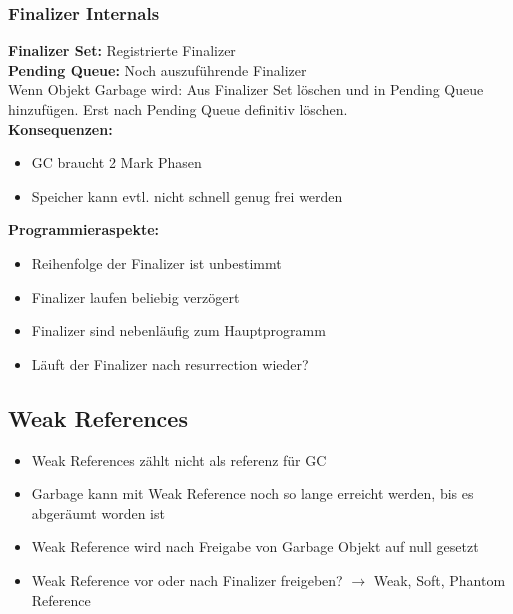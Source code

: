 \subsubsection{Finalizer Internals}
\textbf{Finalizer Set:} Registrierte Finalizer\\
\textbf{Pending Queue:} Noch auszuführende Finalizer\\
Wenn Objekt Garbage wird: Aus Finalizer Set löschen und in Pending Queue hinzufügen. Erst nach Pending Queue definitiv löschen.\\
\textbf{Konsequenzen:}
\begin{itemize}[topsep=0pt]
    \itemsep -0.2em
    \item GC braucht 2 Mark Phasen
    \item Speicher kann evtl. nicht schnell genug frei werden
\end{itemize}
\textbf{Programmieraspekte:}
\begin{itemize}[topsep=0pt]
    \itemsep -0.2em
    \item Reihenfolge der Finalizer ist unbestimmt
    \item Finalizer laufen beliebig verzögert
    \item Finalizer sind nebenläufig zum Hauptprogramm
    \item Läuft der Finalizer nach resurrection wieder?
\end{itemize}

\subsection{Weak References}
\begin{itemize}[topsep=0pt]
    \itemsep -0.2em
    \item Weak References zählt nicht als referenz für GC
    \item Garbage kann mit Weak Reference noch so lange erreicht werden, bis es abgeräumt worden ist
    \item Weak Reference wird nach Freigabe von Garbage Objekt auf null gesetzt
    \item Weak Reference vor oder nach Finalizer freigeben? $\rightarrow$ Weak, Soft, Phantom Reference
\end{itemize}


